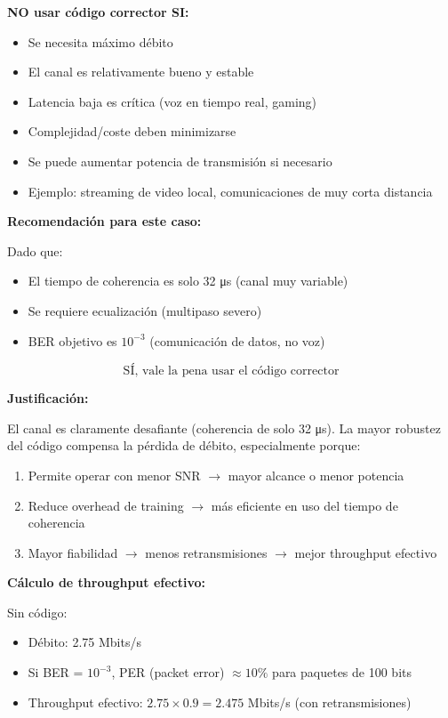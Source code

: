 \documentclass[11pt,a4paper]{article}
\begin{document}
\textbf{NO usar c\'odigo corrector SI:}

\begin{itemize}
    \item Se necesita m\'aximo d\'ebito
    \item El canal es relativamente bueno y estable
    \item Latencia baja es cr\'itica (voz en tiempo real, gaming)
    \item Complejidad/coste deben minimizarse
    \item Se puede aumentar potencia de transmisi\'on si necesario
    \item Ejemplo: streaming de video local, comunicaciones de muy corta distancia
\end{itemize}

\textbf{Recomendaci\'on para este caso:}

Dado que:
\begin{itemize}
    \item El tiempo de coherencia es solo 32 μs (canal muy variable)
    \item Se requiere ecualizaci\'on (multipaso severo)
    \item BER objetivo es $10^{-3}$ (comunicaci\'on de datos, no voz)
\end{itemize}

\[
\boxed{\text{S\'I, vale la pena usar el c\'odigo corrector}}
\]

\textbf{Justificaci\'on:}

El canal es claramente desafiante (coherencia de solo 32 μs). La mayor robustez del c\'odigo compensa la p\'erdida de d\'ebito, especialmente porque:

\begin{enumerate}
    \item Permite operar con menor SNR $\to$ mayor alcance o menor potencia
    
    \item Reduce overhead de training $\to$ m\'as eficiente en uso del tiempo de coherencia
    
    \item Mayor fiabilidad $\to$ menos retransmisiones $\to$ mejor throughput efectivo
\end{enumerate}

\textbf{C\'alculo de throughput efectivo:}

Sin c\'odigo:
\begin{itemize}
    \item D\'ebito: 2.75 Mbits/s
    \item Si BER = $10^{-3}$, PER (packet error) $\approx 10\%$ para paquetes de 100 bits
    \item Throughput efectivo: $2.75 \times 0.9 = 2.475$ Mbits/s (con retransmisiones)
\end{itemize}
\end{document}
